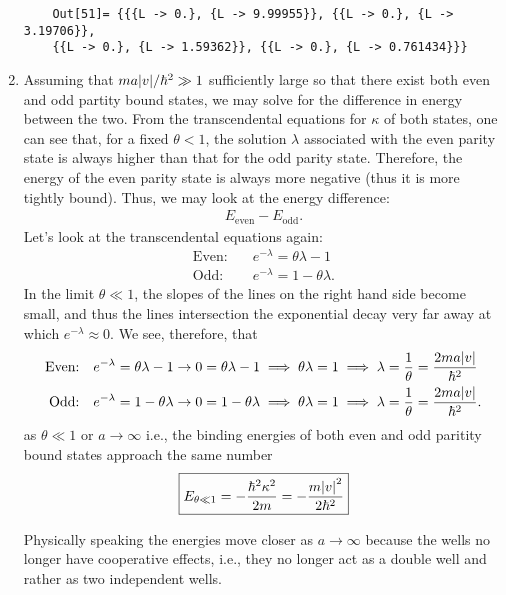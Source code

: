 \documentclass{article}
\theoremstyle{definition}
\newcommand{\f}[2]{\frac{#1}{#2}}
\begin{document}
\begin{enumerate}[label=(\alph*)]
\begin{lstlisting}
	Out[51]= {{{L -> 0.}, {L -> 9.99955}}, {{L -> 0.}, {L -> 3.19706}}, 
	{{L -> 0.}, {L -> 1.59362}}, {{L -> 0.}, {L -> 0.761434}}}
	\end{lstlisting}
	
	\item Assuming that $ma\abs{v}/\hbar^2 \gg 1$ sufficiently large so that there exist both even and odd partity bound states, we may solve for the difference in energy between the two. From the transcendental equations for $\kappa$ of both states, one can see that, for a fixed $\theta < 1$, the solution $\lambda$ associated with the even parity state is always higher than that for the odd parity state. Therefore, the energy of the even parity state is always more negative (thus it is more tightly bound). Thus, we may look at the energy difference:
	\begin{align*}
	E_\text{even} - E_\text{odd}.
	\end{align*} 
	Let's look at the transcendental equations again:
	\begin{align*}
	\text{Even:}& \quad e^{-\lambda} = \theta\lambda - 1\\
	\text{Odd:}& \quad e^{-\lambda} = 1-\theta\lambda.
	\end{align*}
	In the limit $\theta \ll 1$, the slopes of the lines on the right hand side become small, and thus the lines intersection the exponential decay very far away at which $e^{-\lambda}\approx 0$. We see, therefore, that 
	\begin{align*}
	\text{Even:}& \quad e^{-\lambda} = \theta\lambda - 1 \to 0=\theta\lambda -1 \implies \theta\lambda = 1 \implies \lambda = \f{1}{\theta} = \f{2ma\abs{v}}{\hbar^2}\\
	\text{Odd:}& \quad e^{-\lambda} = 1-\theta\lambda\to 0 = 1 - \theta\lambda \implies \theta\lambda = 1 \implies \lambda = \f{1}{\theta} = \f{2ma\abs{v}}{\hbar^2}.
	\end{align*}
	as $\theta \ll 1$ or $a\to \infty$ i.e., the binding energies of both even and odd paritity bound states approach the same number
	\begin{align*}
	\boxed{E_{\theta \ll 1} = -\f{\hbar^2\kappa^2}{2m} = -\f{m\abs{v}^2}{2\hbar^2}}
	\end{align*}
	
	
	Physically speaking the energies move closer as $a\to \infty$ because the wells no longer have cooperative effects, i.e., they no longer act as a double well and rather as two independent wells. 
	
\end{enumerate}

	
\end{document}
